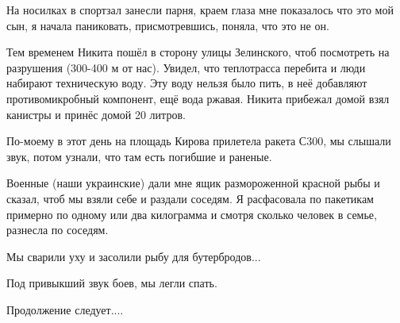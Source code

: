 На носилках в спортзал занесли парня, краем глаза мне показалось что это мой
сын, я начала паниковать, присмотревшись, поняла, что это не он. 

Тем временем Никита пошёл в сторону улицы Зелинского, чтоб посмотреть на
разрушения (300-400 м от нас). Увидел, что теплотрасса перебита и люди набирают
техническую воду. Эту воду нельзя было пить, в неё добавляют противомикробный
компонент, ещё вода ржавая. Никита прибежал домой взял канистры и принёс домой
20 литров. 

По-моему в этот день на площадь Кирова прилетела ракета С300, мы слышали звук,
потом узнали, что там есть погибшие и раненые. 

Военные (наши украинские) дали мне ящик размороженной красной рыбы и сказал,
чтоб мы взяли себе и раздали соседям. Я расфасовала по пакетикам примерно по
одному или два килограмма и смотря сколько человек в семье, разнесла по
соседям. 

Мы сварили уху и засолили рыбу для бутербродов...

Под привыкший звук боев, мы легли спать. 

Продолжение следует....

